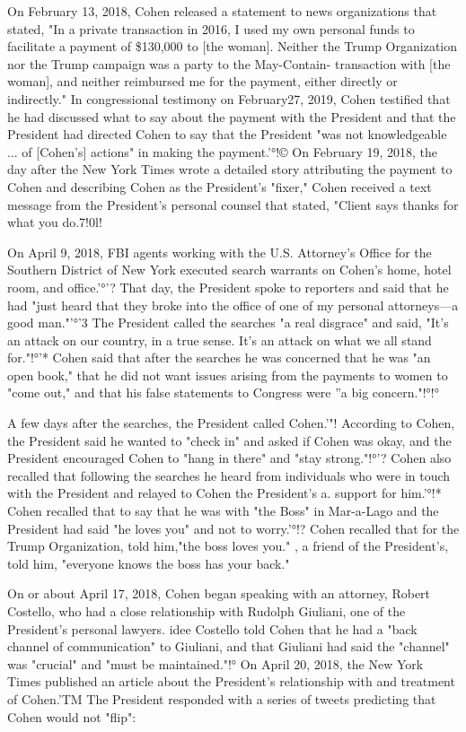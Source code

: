On February 13, 2018, Cohen released a statement to news organizations that stated, "In a private transaction in 2016, I used my own personal funds to facilitate a payment of \$130,000 to [the woman].
Neither the Trump Organization nor the Trump campaign was a party to the May-Contain- transaction with [the woman], and neither reimbursed me for the payment, either directly or indirectly."
In congressional testimony on February27, 2019, Cohen testified that he had discussed what to say about the payment with the President and that the President had directed Cohen to say that the President "was not knowledgeable ... of [Cohen's] actions" in making the payment.'°!©
On February 19, 2018, the day after the New York Times wrote a detailed story attributing the payment to Cohen and describing Cohen as the President's "fixer," Cohen received a text message from the President's personal counsel that stated, "Client says thanks for what you do.7!0l!

On April 9, 2018, FBI agents working with the U.S. Attorney's Office for the Southern District of New York executed search warrants on Cohen's home, hotel room, and office.'°'?
That day, the President spoke to reporters and said that he had "just heard that they broke into the office of one of my personal attorneys—a good man."'°'3
The President called the searches "a real disgrace" and said, "It's an attack on our country, in a true sense.
It's an attack on what we all stand for."!°'*
Cohen said that after the searches he was concerned that he was "an open book," that he did not want issues arising from the payments to women to "come out," and that his false statements to Congress were ''a big concern."!°!°

A few days after the searches, the President called Cohen.'"!
According to Cohen, the President said he wanted to "check in" and asked if Cohen was okay, and the President encouraged Cohen to "hang in there" and "stay strong."!°'?
Cohen also recalled that following the searches he heard from individuals who were in touch with the President and relayed to Cohen the President's
a.
support for him.'°!* Cohen recalled that
to say that he was with "the Boss" in Mar-a-Lago and the President had said "he loves you" and not to worry.'°!?
Cohen recalled that for the Trump Organization, told him,"the boss loves you." , a friend of the President's, told him, "everyone knows the boss has your back."

On or about April 17, 2018, Cohen began speaking with an attorney, Robert Costello, who had a close relationship with Rudolph Giuliani, one of the President's personal lawyers.
idee Costello told Cohen that he had a "back channel of communication" to Giuliani, and that Giuliani had said the "channel" was "crucial" and "must be maintained."!°
On April 20, 2018, the New York Times published an article about the President's relationship with and treatment of Cohen.'TM The President responded with a series of tweets predicting that Cohen would not "flip":

